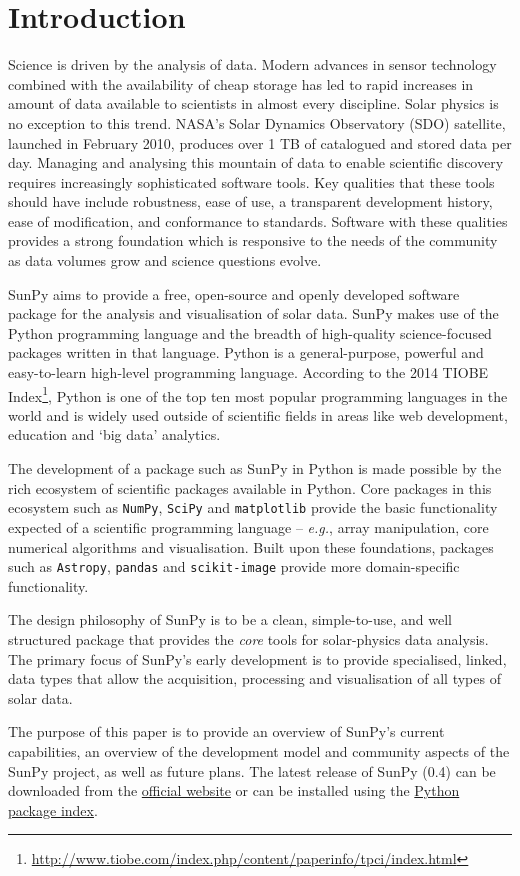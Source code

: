 \section{Introduction}\label{sec:Intro}

Science is driven by the analysis of data. Modern advances in sensor
technology combined with the availability of cheap storage has led to
rapid increases in amount of data available to scientists in almost
every discipline.  Solar physics is no exception to this trend. NASA's
Solar Dynamics Observatory (SDO) satellite, launched in February 2010,
produces over 1 TB of catalogued and stored data per day. Managing and
analysing this mountain of data to enable scientific discovery
requires increasingly sophisticated software tools.  Key qualities
that these tools should have include robustness, ease of use, a
transparent development history, ease of modification, and conformance
to standards.  Software with these qualities provides a strong
foundation which is responsive to the needs of the community as data
volumes grow and science questions evolve.

SunPy aims to provide a free, open-source and openly developed software package 
for the analysis and visualisation of solar data. SunPy makes use of the Python 
programming language and the breadth of high-quality science-focused packages 
written in that language. Python is a general-purpose, powerful and 
easy-to-learn high-level programming language.
According to the 2014 TIOBE Index\footnote{\url{http://www.tiobe.com/index.php/content/paperinfo/tpci/index.html}},
 Python is one of the top ten most popular programming languages in the world 
and is widely used outside of scientific fields in areas like web development, education and `big data' analytics.

The development of a package such as SunPy in Python is made possible by the 
rich ecosystem of scientific packages available in Python. Core packages in this 
ecosystem such as \texttt{NumPy}, \texttt{SciPy} and \texttt{matplotlib} 
provide the basic functionality expected of a scientific programming language -- 
\textit{e.g.}, array manipulation, core numerical algorithms and visualisation. 
Built upon these foundations, packages such as \texttt{Astropy}, \texttt{pandas} and 
\texttt{scikit-image} provide more domain-specific functionality.

The design philosophy of SunPy is to be a clean, simple-to-use, and well 
structured package that provides the \textit{core} tools for solar-physics data 
analysis. The primary focus of SunPy's early development is to provide 
specialised, linked, data types that allow the acquisition, processing and 
visualisation of all types of solar data.

The purpose of this paper is to provide an overview of SunPy's current 
capabilities, an overview of the development model and community aspects of the 
SunPy project, as well as future plans. The latest release of SunPy (0.4)
can be downloaded from the \href{http://sunpy.org}{official website} or can be
installed using the \href{http://pypi.python.org/pypi}{Python package index}.